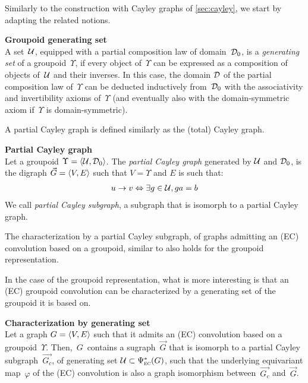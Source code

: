 
Similarly to the construction with Cayley graphs of \ref{sec:cayley}, we start by adapting the related notions.

\begin{definition}\textbf{Groupoid generating set}\\
A set~$\mathcal{U}$, equipped with a partial composition law of domain~$\mathcal{D}_0$, is a \emph{generating set} of a groupoid~$\Upsilon$, if every object of~$\Upsilon$ can be expressed as a composition of objects of~$\mathcal{U}$ and their inverses. In this case, the domain $\mathcal{D}$ of the partial composition law of~$\Upsilon$ can be deducted inductively from~$\mathcal{D}_0$ with the associativity and invertibility axioms of~$\Upsilon$ (and eventually also with the domain-symmetric axiom if~$\Upsilon$ is domain-symmetric).
\end{definition}

A partial Cayley graph is defined similarly as the (total) Cayley graph.

\begin{definition}\textbf{Partial Cayley graph}\\
Let a groupoid $\Upsilon = \langle \mathcal{U}, \mathcal{D}_0 \rangle$. The \emph{partial Cayley graph} generated by $\mathcal{U}$ and $\mathcal{D}_0$, is the digraph $\vec{G} = \langle V, E \rangle$ such that $V = \Upsilon$ and $E$ is such that:
\begin{gather*}
u \rightarrow v \Leftrightarrow \exists g \in \mathcal{U}, ga = b
\end{gather*}
We call \emph{partial Cayley subgraph}, a subgraph that is isomorph to a partial Cayley graph.
\end{definition}

\begin{remark}
The characterization by a partial Cayley subgraph, of graphs admitting an (EC) convolution based on a groupoid, similar to  also holds for the groupoid representation.%
\end{remark}

In the case of the groupoid representation, what is more interesting is that an (EC) groupoid convolution can be characterized by a generating set of the groupoid it is based on.

\begin{proposition}\textbf{Characterization by generating set}\\
Let a graph $G = \langle V, E \rangle$ such that it admits an (EC) convolution based on a groupoid~$\Upsilon$. Then,~$G$~contains a sugraph~$\vec{G}$ that is isomorph to a partial Cayley subgraph~$\vec{G_c}$, of generating set $\mathcal{U} \subset \Psi^*_{\operatorname{\textsc{ec}}}(G)$, such that the underlying equivariant map~$\varphi$ of the (EC) convolution is also a graph isomorphism between~$\vec{G_c}$ and~$\vec{G}$.
\end{proposition}

